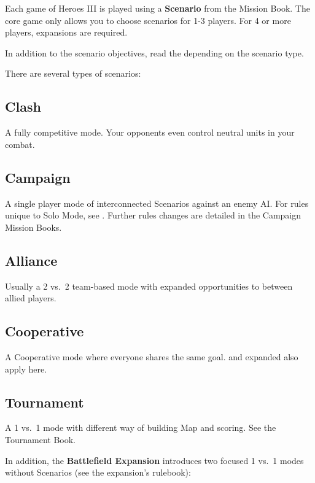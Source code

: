 
\begin{multicols*}{2}

Each game of Heroes III is played using a \textbf{Scenario} from the Mission Book. 
The core game only allows you to choose scenarios for 1-3 players. For 4 or more players, expansions are required.\par
In addition to the scenario objectives, read the  depending on the scenario type.\par 
There are several types of scenarios:

\subsection*{Clash}
A fully competitive mode. Your opponents even control neutral units in your combat.

\subsection*{Campaign}
A single player mode of interconnected Scenarios against an enemy AI.
For rules unique to Solo Mode, see .
Further rules changes are detailed in the Campaign Mission Books.

\subsection*{Alliance}
Usually a 2 vs.~2 team-based mode with expanded opportunities to  between allied players.

\subsection*{Cooperative}
A Cooperative mode where everyone shares the same goal.  and expanded  also apply here.

\subsection*{Tournament}
A 1 vs.~1 mode with different way of building Map and scoring. See the Tournament Book.

\columnbreak

In addition, the \textbf{Battlefield Expansion} introduces two focused 1 vs.~1 modes without Scenarios (see the expansion's rulebook):


\end{multicols*}
